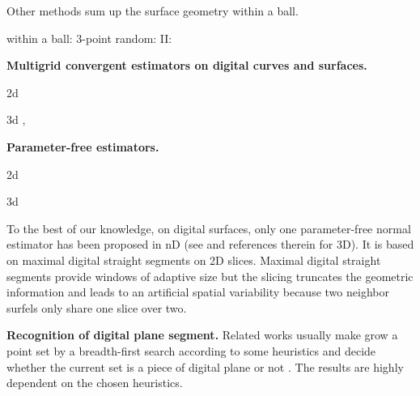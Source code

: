 Other methods sum up the surface geometry within a ball.  



within a ball: 3-point random: \cite{Boulch2012,Zhang2013} II: \cite{Pottmann2009}


\noindent\textbf{Multigrid convergent estimators on digital curves and surfaces.}

2d \cite{Provot2011,Esbelin2011,Esbelin2016}

3d \cite{Fourey2009}, \cite{Coeurjolly2014, Cuel2015}

\noindent\textbf{Parameter-free estimators.}

2d \cite{Lachaud2007}

3d  

To the best of our knowledge, on digital surfaces, only one parameter-free normal estimator
has been proposed in nD (see \cite{Lachaud2003} and references therein for 3D).
It is based on maximal digital straight segments on 2D slices.
Maximal digital straight segments provide windows of adaptive size
but the slicing truncates the geometric information and leads to
an artificial spatial variability because two neighbor surfels only
share one slice over two.


\noindent\textbf{Recognition of digital plane segment.}
Related works usually make grow a point set by a breadth-first search according to some heuristics and decide whether the current set is a piece of digital plane or not \cite{Sivignon2004,Charrier2011}. The results are highly dependent on the chosen heuristics.   

